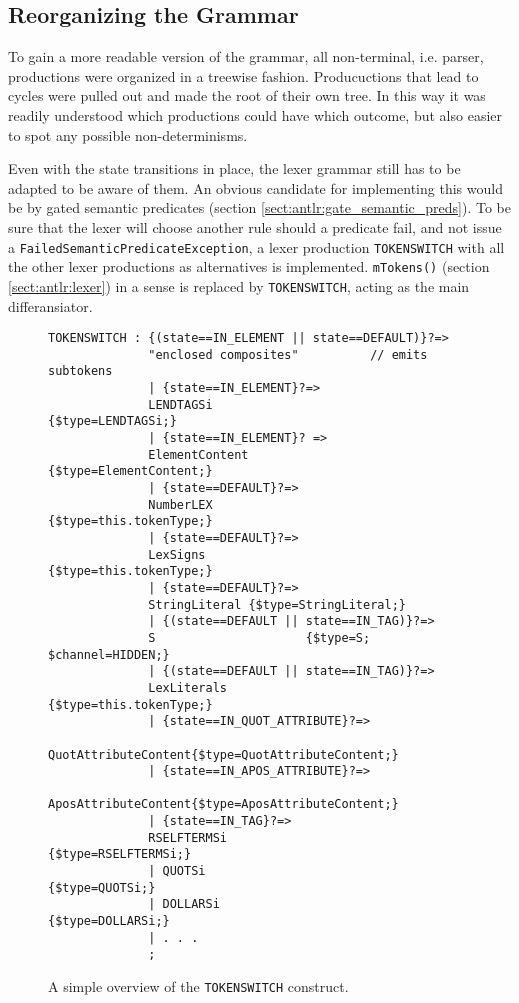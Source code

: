 \subsection{Reorganizing the Grammar}
\label{sect:rewriteGrammar:reorganizing}

To gain a more readable version of the grammar, all non-terminal, i.e. parser, productions were organized in a treewise fashion. Producuctions that lead to cycles were pulled out and made the root of their own tree. In this way it was readily understood which productions could have which outcome, but also easier to spot any possible non-determinisms.

Even with the state transitions in place, the lexer grammar still has to be adapted to be aware of them. An obvious candidate for implementing this would be by gated semantic predicates (section \ref{sect:antlr:gate_semantic_preds}). To be sure that the lexer will choose another rule should a predicate fail, and not issue a \verb!FailedSemanticPredicateException!, a lexer production \verb!TOKENSWITCH! with all the other lexer productions as alternatives is implemented. \verb!mTokens()! (section \ref{sect:antlr:lexer}) in a sense is replaced by \verb!TOKENSWITCH!, acting as the main differansiator. 

\begin{figure}[h!]
\begin{Verbatim}
TOKENSWITCH : {(state==IN_ELEMENT || state==DEFAULT)}?=>
              "enclosed composites"          // emits subtokens
              | {state==IN_ELEMENT}?=>
              LENDTAGSi                      {$type=LENDTAGSi;}
              | {state==IN_ELEMENT}? =>
              ElementContent            {$type=ElementContent;} 
              | {state==DEFAULT}?=>
              NumberLEX	                {$type=this.tokenType;}
              | {state==DEFAULT}?=>
              LexSigns                  {$type=this.tokenType;}
              | {state==DEFAULT}?=>
              StringLiteral {$type=StringLiteral;}
              | {(state==DEFAULT || state==IN_TAG)}?=>
              S                     {$type=S; $channel=HIDDEN;}
              | {(state==DEFAULT || state==IN_TAG)}?=>
              LexLiterals               {$type=this.tokenType;} 
              | {state==IN_QUOT_ATTRIBUTE}?=>
              QuotAttributeContent{$type=QuotAttributeContent;}
              | {state==IN_APOS_ATTRIBUTE}?=>
              AposAttributeContent{$type=AposAttributeContent;}
              | {state==IN_TAG}?=>
              RSELFTERMSi                  {$type=RSELFTERMSi;}
              | QUOTSi                          {$type=QUOTSi;}
              | DOLLARSi                      {$type=DOLLARSi;}
              | . . .
              ;

\end{Verbatim}
\caption[Overview of the \texttt{TOKENSWITCH} construct]{A simple overview of the \texttt{TOKENSWITCH} construct.}
\label{fig:tokenswitch}
\end{figure}

